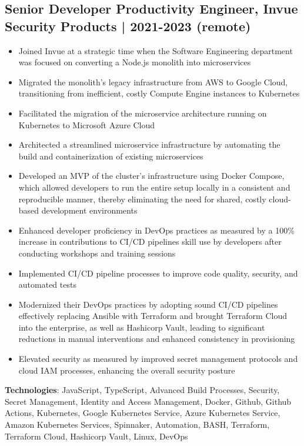 \documentclass[11pt,a4paper]{article}
\begin{document}
\subsection*{Senior Developer Productivity Engineer, Invue Security Products | 2021-2023 (remote)}
\label{sec:orgf21f585}
\begin{itemize}
\item Joined Invue at a strategic time when the Software Engineering department was focused on converting a Node.js monolith into microservices
\item Migrated the monolith's legacy infrastructure from AWS to Google Cloud, transitioning from inefficient, costly Compute Engine instances to Kubernetes
\item Facilitated the migration of the microservice architecture running on Kubernetes to Microsoft Azure Cloud
\item Architected a streamlined microservice infrastructure by automating the build and containerization of existing microservices
\item Developed an MVP of the cluster's infrastructure using Docker Compose, which allowed developers to run the entire setup locally in a consistent and reproducible manner, thereby eliminating the need for shared, costly cloud-based development environments
\item Enhanced developer proficiency in DevOps practices as measured by a 100\% increase in contributions to CI/CD pipelines skill use by developers after conducting workshops and training sessions
\item Implemented CI/CD pipeline processes to improve code quality, security, and automated tests
\item Modernized their DevOps practices by adopting sound CI/CD pipelines effectively replacing Ansible with Terraform and brought Terraform Cloud into the enterprise, as well as Hashicorp Vault, leading to significant reductions in manual interventions and enhanced consistency in provisioning
\item Elevated security as measured by improved secret management protocols and cloud IAM processes, enhancing the overall security posture
\end{itemize}

\textbf{Technologies}: JavaScript, TypeScript, Advanced Build Processes, Security, Secret Management, Identity and Access Management, Docker, Github, Github Actions, Kubernetes, Google Kubernetes Service, Azure Kubernetes Service, Amazon Kubernetes Services, Spinnaker, Automation, BASH, Terraform, Terraform Cloud, Hashicorp Vault, Linux, DevOps
\end{document}
